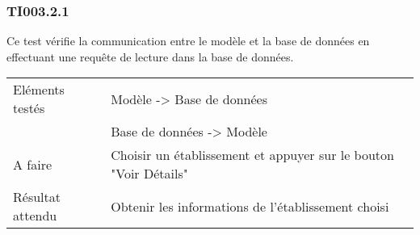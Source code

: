 
\subsubsection{TI003.2.1}
\label{TI003.2.1}
  		Ce test vérifie la communication entre le modèle et la base de données en effectuant une requête de lecture dans la base de données.
  		\begin{center}
    	 		\begin{tabular}[h]{|p{}|p{}|}
			\hline
				Eléments testés & Modèle -> Base de données  \\
							    &  Base de données -> Modèle \\\hline
    				A faire & Choisir un établissement et appuyer sur le bouton "Voir Détails" \\\hline
    				Résultat attendu & Obtenir les informations de l'établissement choisi \\\hline
     		\end{tabular}
  		\end{center}	